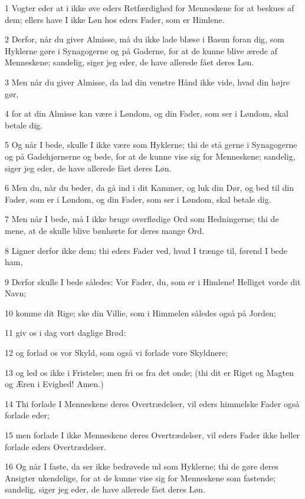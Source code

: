 \par 1 Vogter eder at i ikke øve eders Retfærdighed for Menneskene for at beskues af dem; ellers have I ikke Løn hos eders Fader, som er Himlene.
\par 2 Derfor, når du giver Almisse, må du ikke lade blæse i Basun foran dig, som Hyklerne gøre i Synagogerne og på Gaderne, for at de kunne blive ærede af Menneskene; sandelig, siger jeg eder, de have allerede fået deres Løn.
\par 3 Men når du giver Almisse, da lad din venstre Hånd ikke vide, hvad din højre gør,
\par 4 for at din Almisse kan være i Løndom, og din Fader, som ser i Løndom, skal betale dig.
\par 5 Og når I bede, skulle I ikke være som Hyklerne; thi de stå gerne i Synagogerne og på Gadehjørnerne og bede, for at de kunne vise sig for Menneskene; sandelig, siger jeg eder, de have allerede fået deres Løn.
\par 6 Men du, når du beder, da gå ind i dit Kammer, og luk din Dør, og bed til din Fader, som er i Løndom, og din Fader, som ser i Løndom, skal betale dig.
\par 7 Men når I bede, må I ikke bruge overflødige Ord som Hedningerne; thi de mene, at de skulle blive bønhørte for deres mange Ord.
\par 8 Ligner derfor ikke dem; thi eders Fader ved, hvad I trænge til, førend I bede ham,
\par 9 Derfor skulle I bede således: Vor Fader, du, som er i Himlene! Helliget vorde dit Navn;
\par 10 komme dit Rige; ske din Villie, som i Himmelen således også på Jorden;
\par 11 giv os i dag vort daglige Brød:
\par 12 og forlad os vor Skyld, som også vi forlade vore Skyldnere;
\par 13 og led os ikke i Fristelse; men fri os fra det onde; (thi dit er Riget og Magten og Æren i Evighed! Amen.)
\par 14 Thi forlade I Menneskene deres Overtrædelser, vil eders himmelske Fader også forlade eder;
\par 15 men forlade I ikke Menneskene deres Overtrædelser, vil eders Fader ikke heller forlade eders Overtrædelser.
\par 16 Og når I faste, da ser ikke bedrøvede ud som Hyklerne; thi de gøre deres Ansigter ukendelige, for at de kunne vise sig for Menneskene som fastende; sandelig, siger jeg eder, de have allerede fået deres Løn.
